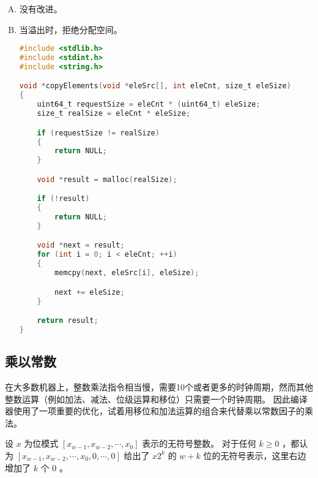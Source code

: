 {{\begin{practicec}
        \end{practicec}

        \begin{practicec}
            \begin{enumerate}[A.]
                \item 没有改进。
                \item
                {
                    当溢出时，拒绝分配空间。

                    \begin{codelist}
                        \begin{lstlisting}[language=C]
#include <stdlib.h>
#include <stdint.h>
#include <string.h>

void *copyElements(void *eleSrc[], int eleCnt, size_t eleSize)
{
    uint64_t requestSize = eleCnt * (uint64_t) eleSize;
    size_t realSize = eleCnt * eleSize;

    if (requestSize != realSize)
    {
        return NULL;
    }

    void *result = malloc(realSize);

    if (!result)
    {
        return NULL;
    }

    void *next = result;
    for (int i = 0; i < eleCnt; ++i)
    {
        memcpy(next, eleSrc[i], eleSize);

        next += eleSize;
    }

    return result;
}
                        \end{lstlisting}
                    \end{codelist}
                }
            \end{enumerate}
        \end{practicec}
    }

    \subsection{乘以常数}
    {
        在大多数机器上，整数乘法指令相当慢，需要10个或者更多的时钟周期，然而其他整数运算（例如加法、减法、位级运算和移位）只需要一个时钟周期。
        因此编译器使用了一项重要的优化，试着用移位和加法运算的组合来代替乘以常数因子的乘法。

        \begin{defines}[乘以2的幂]
            设 $x$ 为位模式 $[x_{w - 1}, x_{w - 2}, \cdots, x_0]$ 表示的无符号整数。
            对于任何 $k \geq 0$ ，都认为 $[x_{w - 1}, x_{w - 2}, \cdots, x_0, 0, \cdots, 0]$ 给出了 $x2^k$ 的 $w + k$ 位的无符号表示，这里右边增加了 $k$ 个 $0$ 。
        \end{defines}

}}
